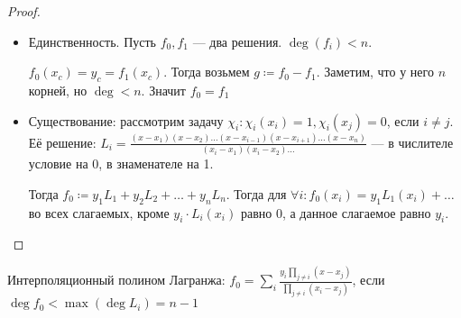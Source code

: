 \begin{proof}
    \slashn
    \begin{itemize}
    \item Единственность. Пусть $f_0, f_1$ --- два решения.  $\deg(f_i) < n$.  

        $f_0(x_c) = y_c = f_1(x_c)$. Тогда возьмем $g \coloneqq f_0 - f_1$. Заметим, что у него  $n$ корней, но  $\deg < n$. Значит  $f_0=f_1$
    \item Существование: рассмотрим задачу $\chi_i\!: \chi_i(x_i) = 1, \chi_i(x_j) = 0$, если  $i \neq j$. Её решение:  $L_i = \frac{(x-x_1)(x-x_2)\ldots(x - x_{i-1})(x - x_{i+1})\ldots(x - x_n)}{(x_i - x_1)(x_i - x_2)\ldots}$ --- в числителе условие на 0, в знаменателе на 1.

        Тогда $f_0 \coloneqq y_1 L_1 + y_2 L_2 + \ldots +y_nL_n$. Тогда для $\forall i\!: f_0(x_i) = y_1L_1(x_i) + \ldots$ во всех слагаемых, кроме $y_i \cdot L_i(x_i)$ равно 0, а данное слагаемое равно  $y_i$.
    \end{itemize}
\end{proof}
\begin{definition}
    Интерполяционный полином Лагранжа: $f_0 = \sum_i \frac{y_i \prod_{j \neq i}(x - x_j)}{\prod_{j \neq i}(x_i - x_j)}$, если $\deg f_0 < \max(\deg L_i) = n-1$
\end{definition}

